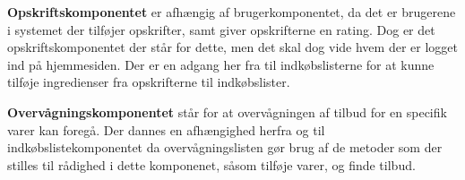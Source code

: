 \textbf{Opskriftskomponentet} er afhængig af brugerkomponentet, da det er brugerene i systemet der tilføjer opskrifter, samt giver opskrifterne en rating.
Dog er det opskriftskomponentet der står for dette, men det skal dog vide hvem der er logget ind på hjemmesiden.
Der er en adgang her fra til indkøbslisterne for at kunne tilføje ingredienser fra opskrifterne til indkøbslister.

\textbf{Overvågningskomponentet} står for at overvågningen af tilbud for en specifik varer kan foregå.
Der dannes en afhængighed herfra og til indkøbslistekomponentet da overvågningslisten gør brug af de metoder som der stilles til rådighed i dette komponenet, såsom tilføje varer, og finde tilbud.



